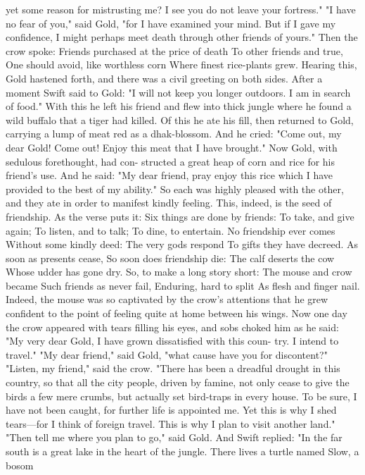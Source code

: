 \documentclass{book}
\begin{document}
yet some reason for mistrusting me? I see you do not
leave your fortress."
"I have no fear of you," said Gold, "for I have
examined your mind. But if I gave my confidence, I
might perhaps meet death through other friends of
yours." Then the crow spoke:
Friends purchased at the price of death
To other friends and true,
One should avoid, like worthless corn
Where finest rice-plants grew.
Hearing this, Gold hastened forth, and there was
a civil greeting on both sides. After a moment Swift
said to Gold: "I will not keep you longer outdoors.
I am in search of food." With this he left his friend
and flew into thick jungle where he found a wild
buffalo that a tiger had killed. Of this he ate his fill,
then returned to Gold, carrying a lump of meat red
as a dhak-blossom. And he cried: "Come out, my
dear Gold! Come out! Enjoy this meat that I
have brought."
Now Gold, with sedulous forethought, had con-
structed a great heap of corn and rice for his friend's
use. And he said: "My dear friend, pray enjoy this
rice which I have provided to the best of my ability."
So each was highly pleased with the other, and they
ate in order to manifest kindly feeling. This, indeed,
is the seed of friendship. As the verse puts it:
Six things are done by friends:
To take, and give again;
To listen, and to talk;
To dine, to entertain.
No friendship ever comes
Without some kindly deed:
The very gods respond
To gifts they have decreed.
As soon as presents cease,
So soon does friendship die:
The calf deserts the cow
Whose udder has gone dry.
So, to make a long story short:
The mouse and crow became
Such friends as never fail,
Enduring, hard to split
As flesh and finger nail.
Indeed, the mouse was so captivated by the crow's
attentions that he grew confident to the point of
feeling quite at home between his wings.
Now one day the crow appeared with tears filling
his eyes, and sobs choked him as he said: "My very
dear Gold, I have grown dissatisfied with this coun-
try. I intend to travel." "My dear friend," said
Gold, "what cause have you for discontent?"
"Listen, my friend," said the crow. "There has
been a dreadful drought in this country, so that all
the city people, driven by famine, not only cease to
give the birds a few mere crumbs, but actually set
bird-traps in every house. To be sure, I have not been
caught, for further life is appointed me. Yet this is
why I shed tears---for I think of foreign travel. This
is why I plan to visit another land." "Then tell me
where you plan to go," said Gold. And Swift replied:
"In the far south is a great lake in the heart of the
jungle. There lives a turtle named Slow, a bosom
\end{document}
